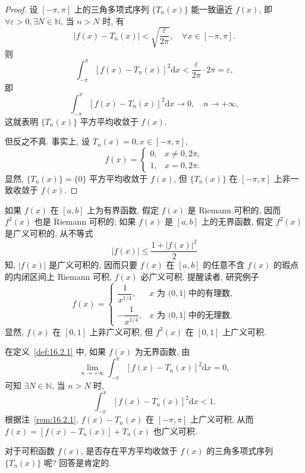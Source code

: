 \begin{proof}
设 $[-\pi, \pi]$ 上的三角多项式序列 $\{T_{n}(x)\}$ 能一致逼近 $f(x)$, 即 $\forall \varepsilon > 0, \exists N \in \mathbb{N}$, 当 $n > N$ 时, 有
\[
  |f(x)-T_{n}(x)|<\sqrt{\frac{\varepsilon}{2\pi}},\quad\forall x\in[-\pi,\pi].
\]
则
\[
  \int_{-\pi}^{\pi}\left[f(x)-T_{n}(x)\right]^{2}\mathrm{d}x<\frac{\varepsilon}{2\pi}\cdot2\pi=\varepsilon,
\]
即
\[
  \int_{-\pi}^{\pi}\left[f(x)-T_{n}(x)\right]^{2}\mathrm{d}x\to0,\quad n\to+\infty,
\]
这就表明 $\{T_{n}(x)\}$ 平方平均收敛于 $f(x)$.

但反之不真. 事实上, 设 $T_{n}(x)=0, x\in[-\pi,\pi]$,
\[
  f(x)=\begin{cases}
    0, & x\neq0,2\pi,\\
    1, & x=0,2\pi.
\end{cases}
\]
显然, $\{T_{n}(x)\}=\{0\}$ 平方平均收敛于 $f(x)$, 但 $\{T_{n}(x)\}$ 在 $[-\pi, \pi]$ 上非一致收敛于 $f(x)$.
\end{proof}

\begin{remark}\label{rem:16.2.1}
如果 $f(x)$ 在 $[a,b]$ 上为有界函数, 假定 $f(x)$ 是 Riemann 可积的, 因而 $f^{2}(x)$ 也是 Riemann 可积的; 如果 $f(x)$ 是 $[a,b]$ 上的无界函数, 假定 $f^{2}(x)$ 是广义可积的. 从不等式
\[
  |f(x)|\leqslant\frac{1+|f(x)|^{2}}{2}
\]
知, $|f(x)|$ 是广义可积的, 因而只要 $f(x)$ 在 $[a,b]$ 的任意不含 $f(x)$ 的瑕点的内闭区间上 Riemann 可积, $f(x)$ 必广义可积. 提醒读者, 研究例子
\[
  f(x)=\begin{cases}
    \dfrac{1}{x^{1/4}}, & x\text{ 为 }(0,1]\text{ 中的有理数},\\
    -\dfrac{1}{x^{1/4}}, & x\text{ 为 }(0,1]\text{ 中的无理数}.
\end{cases}
\]
显然, $f(x)$ 在 $[0,1]$ 上非广义可积, 但 $f^{2}(x)$ 在 $[0,1]$ 上广义可积.
\end{remark}

\begin{remark}\label{rem:16.2.2}
在定义~\ref{def:16.2.1} 中, 如果 $f(x)$ 为无界函数, 由
\[
  \lim_{n\to+\infty}\int_{-\pi}^{\pi}\left[f(x)-T_{n}(x)\right]^{2}\mathrm{d}x=0,
\]
可知 $\exists N \in \mathbb{N}$, 当 $n > N$ 时,
\[
  \int_{-\pi}^{\pi}\left[f(x)-T_{n}(x)\right]^{2}\mathrm{d}x<1.
\]
根据注~\ref{rem:16.2.1}, $f(x)-T_{n}(x)$ 在 $[-\pi,\pi]$ 上广义可积, 从而 $f(x)=[f(x)-T_{n}(x)]+T_{n}(x)$ 也广义可积.
\end{remark}

对于可积函数 $f(x)$, 是否存在平方平均收敛于 $f(x)$ 的三角多项式序列 $\{T_{n}(x)\}$ 呢? 回答是肯定的.

